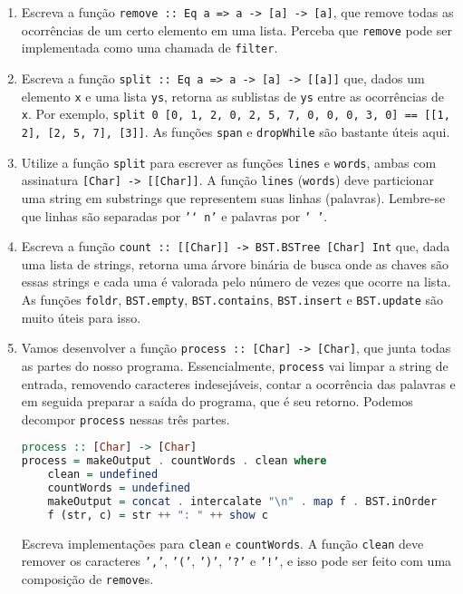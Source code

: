 \documentclass[a4paper]{article}
\begin{document}
\begin{enumerate}
	\item
		Escreva a função \texttt{remove :: Eq a => a -> [a] -> [a]}, que remove todas as ocorrências de um certo elemento em uma lista.
		Perceba que \texttt{remove} pode ser implementada como uma chamada de \texttt{filter}.
	\item
		Escreva a função \texttt{split :: Eq a => a -> [a] -> [[a]]} que, dados um elemento \texttt{x} e uma lista \texttt{ys}, retorna as sublistas de \texttt{ys} entre as ocorrências de \texttt{x}. Por exemplo, \texttt{split 0 [0, 1, 2, 0, 2, 5, 7, 0, 0, 0, 3, 0] == [[1, 2], [2, 5, 7], [3]]}.
		As funções \texttt{span} e \texttt{dropWhile} são bastante úteis aqui.
	\item
		Utilize a função \texttt{split} para escrever as funções \texttt{lines} e \texttt{words}, ambas com assinatura \texttt{[Char] -> [[Char]]}.
		A função \texttt{lines} (\texttt{words}) deve particionar uma string em substrings que representem suas linhas (palavras).
		Lembre-se que linhas são separadas por \texttt{'\char`\\n'} e palavras por \texttt{' '}.
	\item
		Escreva a função \texttt{count :: [[Char]] -> BST.BSTree [Char] Int} que, dada uma lista de strings, retorna uma árvore binária de busca onde as chaves são essas strings e cada uma é valorada pelo número de vezes que ocorre na lista.
		As funções \texttt{foldr}, \texttt{BST.empty}, \texttt{BST.contains}, \texttt{BST.insert} e \texttt{BST.update} são muito úteis para isso.
	\item
		Vamos desenvolver a função \texttt{process :: [Char] -> [Char]}, que junta todas as partes do nosso programa.
		Essencialmente, \texttt{process} vai limpar a string de entrada, removendo caracteres indesejáveis, contar a ocorrência das palavras e em seguida preparar a saída do programa, que é seu retorno.
		Podemos decompor \texttt{process} nessas três partes.
		\begin{lstlisting}[language=haskell, frame=single]
process :: [Char] -> [Char]
process = makeOutput . countWords . clean where
	clean = undefined
	countWords = undefined
	makeOutput = concat . intercalate "\n" . map f . BST.inOrder
	f (str, c) = str ++ ": " ++ show c
		\end{lstlisting}
		Escreva implementações para \texttt{clean} e \texttt{countWords}.
		A função \texttt{clean} deve remover os caracteres \texttt{','}, \texttt{'('}, \texttt{')'}, \texttt{'?'} e \texttt{'!'}, e isso pode ser feito com uma composição de \texttt{remove}s.

\end{enumerate}
\end{document}
